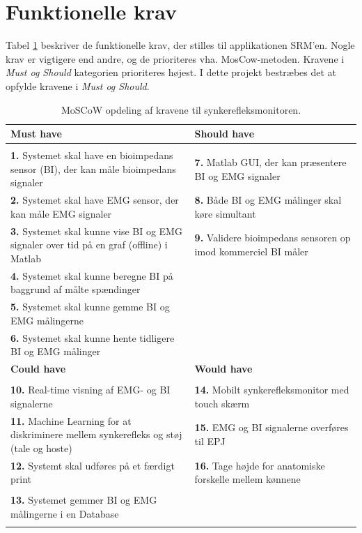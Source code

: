 \pagebreak
\section{Funktionelle krav}

Tabel \ref{tab:moscow} beskriver de funktionelle krav, der stilles til applikationen SRM'en. Nogle krav er vigtigere end andre, og de prioriteres vha. MosCow-metoden. Kravene i \textit{Must og Should} kategorien prioriteres højest.  I dette projekt bestræbes det at opfylde kravene i \textit{Must og Should}. 

\begin{table}[H]

\begin{tabularx}{\textwidth}{X|X}
\rowcolor{Gray}
\toprule
\textbf{Must have} & \textbf{Should have} \\
\hline \\
\textbf{1. }Systemet skal have en bioimpedans sensor (BI), der kan måle bioimpedans signaler & \textbf{7. }Matlab GUI, der kan præsentere BI og EMG signaler \\[4ex]
\textbf{2. }Systemet skal have EMG sensor, der kan måle EMG signaler & \textbf{8. }Både BI og EMG målinger skal køre simultant\\[4ex]
\textbf{3. }Systemet skal kunne vise BI og EMG signaler over tid på en graf (offline) i Matlab  & \textbf{9. }Validere bioimpedans sensoren op imod kommerciel BI måler \\[4ex]
\textbf{4. }Systemet skal kunne beregne BI på baggrund af målte spændinger & \\[4ex]
\textbf{5. }Systemet skal kunne gemme BI og EMG målingerne & \\[4ex]
\textbf{6. }Systemet skal kunne hente tidligere BI og EMG målinger & \\[4ex]


\midrule
    \rowcolor{Gray}
    \textbf{Could have} & \textbf{Would have}\\
    \midrule \\
    \textbf{10. }Real-time visning af EMG- og BI signalerne & \textbf{14. }Mobilt synkerefleksmonitor med touch skærm\\[4ex]
\textbf{11. }Machine Learning for at diskriminere mellem synkerefleks og støj (tale og hoste) & \textbf{15. }EMG og BI signalerne overføres til EPJ  \\[4ex]
\textbf{12. }Systemt skal udføres på et færdigt print& \textbf{16. }Tage højde for anatomiske forskelle mellem kønnene\\[4ex]
& \\
\textbf{13. }Systemet gemmer BI og EMG målingerne i en Database& \\[4ex]
& \\

\end{tabularx}

\caption{MoSCoW opdeling af kravene til  synkerefleksmonitoren.}
  \label{tab:moscow}
\end{table}


